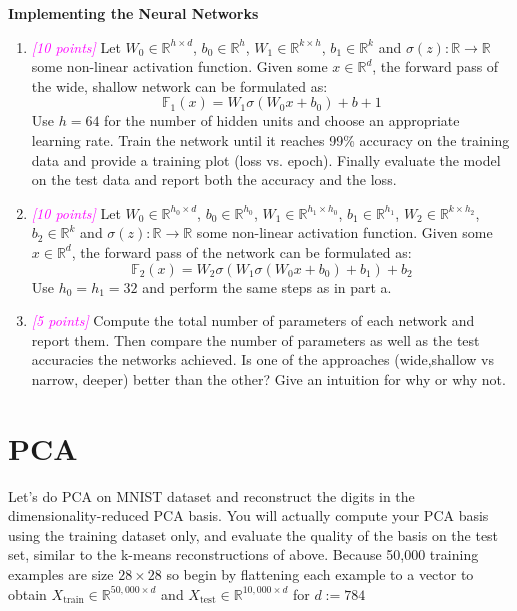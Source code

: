 \documentclass{article}
\newcommand{\field}[1]{\mathbb{#1}}
\newcommand{\1}{\mathbf{1}}
\newcommand{\R}{\field{R}} %
\newcommand{\F}{\field{F}} %
\newcommand{\points}[1]{\small\textcolor{magenta}{\emph{[#1 points]}} \normalsize}
\begin{document}
\textbf{Implementing the Neural Networks}
\begin{enumerate}
    \item \points{10} Let $W_0\in\R^{h\times d}$, $b_0\in\R^h$, $W_1\in\R^{k\times h}$, $b_1\in\R^k$ and $\sigma (z): \R \rightarrow \R$ some non-linear activation function. Given some $x\in\R^d$, the forward pass of the wide, shallow network can be formulated as:
    $$\F_1(x) = W_1\sigma (W_0x+b_0) + b+1$$
    Use $h=64$ for the number of hidden units and choose an appropriate learning rate. Train the network until it reaches 99\% accuracy on the training data and provide a training plot (loss vs. epoch). Finally evaluate the model on the test data and report both the accuracy and the loss.
    
    \item \points{10} Let $W_0\in\R^{h_0\times d}$, $b_0\in\R^{h_0}$, $W_1\in\R^{h_1\times h_0}$, $b_1 \in \R^{h_1}$, $W_2\in \R^{k\times h_2}$, $b_2 \in \R^k$ and $\sigma (z): \R \rightarrow \R$ some non-linear activation function. Given some $x\in\R^d$, the forward pass of the network can be formulated as:
    $$\F_2(x) = W_2\sigma(W_1\sigma (W_0x + b_0) +b_1) + b_2$$
    Use $h_0 = h_1= 32$ and perform the same steps as in part a.
    
     \item \points{5} Compute the total number of parameters of each network and report them. Then compare the number of parameters as well as the test accuracies the networks achieved. Is one of the approaches (wide,shallow vs narrow, deeper) better than the other? Give an intuition for why or why not.
\end{enumerate}

\newpage
\section*{PCA}

Let’s do PCA on MNIST dataset and reconstruct the digits in the dimensionality-reduced PCA basis. You will actually compute your PCA basis using the training dataset only, and evaluate the quality of the basis on the  test set, similar to the k-means reconstructions of above. Because 50,000 training examples are size $28\times 28$ so begin by flattening each example to a vector to obtain $X_{\text{train}} \in \R^{50,000 \times d}$ and $X_{\text{test}} \in \R^{10,000\times d}$ for $d:=784$
\end{document}
